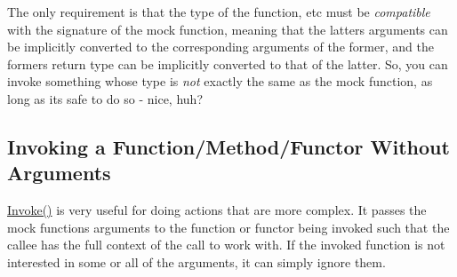 \begin{DoxyCode}{0}
\DoxyCodeLine{\};}
\DoxyCodeLine{}
\DoxyCodeLine{}
\end{DoxyCode}


The only requirement is that the type of the function, etc must be {\itshape compatible} with the signature of the mock function, meaning that the latter\textquotesingle{}s arguments can be implicitly converted to the corresponding arguments of the former, and the former\textquotesingle{}s return type can be implicitly converted to that of the latter. So, you can invoke something whose type is {\itshape not} exactly the same as the mock function, as long as it\textquotesingle{}s safe to do so -\/ nice, huh?

\subsection*{Invoking a Function/\+Method/\+Functor Without Arguments}

{\ttfamily \mbox{\hyperlink{namespacetesting_af5cacf4475557b5a3e37af3836564235}{Invoke()}}} is very useful for doing actions that are more complex. It passes the mock function\textquotesingle{}s arguments to the function or functor being invoked such that the callee has the full context of the call to work with. If the invoked function is not interested in some or all of the arguments, it can simply ignore them.

